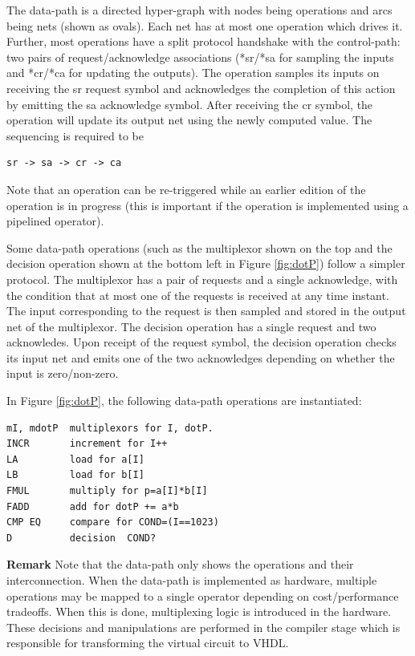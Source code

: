 \documentclass[conference]{IEEEtran}
\begin{document}
The data-path is a directed hyper-graph with nodes being
operations and arcs being nets (shown as ovals).  Each
net has at most one operation which drives it.  Further, most
operations have  a split protocol handshake with
the control-path:  two pairs of request/acknowledge 
associations (*sr/*sa for sampling the inputs  and *cr/*ca for
updating the outputs).    The operation samples its inputs
on receiving the sr request symbol and acknowledges the completion
of this action by emitting the sa acknowledge symbol.  After receiving
the cr symbol, the operation will update its output net
using the newly computed value. The sequencing is required to be
\begin{verbatim}
sr -> sa -> cr -> ca
\end{verbatim}
Note that an operation can be re-triggered while an earlier
edition of the operation
is in progress (this is important if the operation is implemented
using a pipelined operator).

Some data-path operations (such as the multiplexor
shown on the top and the decision operation shown at the bottom
left in Figure \ref{fig:dotP}) follow a simpler protocol.  The multiplexor
has a pair of requests and a single acknowledge, with the condition
that at most one of the requests is received at any time instant.
The input corresponding to the request is then sampled and stored
in the output net of the multiplexor.
The decision operation has a single request and two acknowledes.  Upon
receipt of the request symbol, the decision operation checks its input net
and emits one of the two acknowledges depending on whether the input
is zero/non-zero.

In Figure \ref{fig:dotP}, the following data-path operations
are instantiated:
\begin{verbatim}
mI, mdotP  multiplexors for I, dotP.
INCR       increment for I++
LA         load for a[I]
LB         load for b[I]
FMUL       multiply for p=a[I]*b[I]
FADD       add for dotP += a*b
CMP EQ     compare for COND=(I==1023)
D          decision  COND?
\end{verbatim}


\noindent
{\bf Remark}
Note that the data-path only shows the operations and their interconnection.
When the data-path is implemented as hardware, multiple operations may
be mapped to a single operator depending on cost/performance tradeoffs.  When
this is done, multiplexing logic is introduced in the hardware.  These
decisions and manipulations are performed in the compiler stage which is
responsible for transforming the virtual circuit to VHDL.
\end{document}
